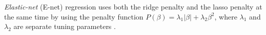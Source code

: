 \documentclass{article}
\newcommand{\argmin}[2]{\underset{#1}{\text{arg min}}\left\{#2\right\}}
\begin{document}

	
	\textit{Elastic-net} (E-net) regression uses both the ridge penalty and the lasso penalty at the same time by using the penalty function $P(\beta)=\lambda_1 \vert \beta \vert + \lambda_2 \beta^2$, where $\lambda_1$ and $\lambda_2$ are separate tuning parameters \cite{zou2005regularization}.
	
\end{document}
